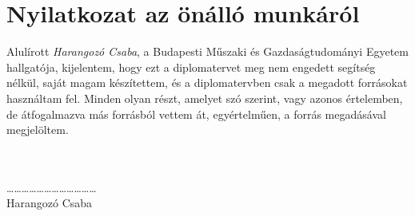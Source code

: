 
\thispagestyle{empty}
\section*{Nyilatkozat az önálló munkáról}

\vfill

\noindent{}Alulírott \emph{Harangozó Csaba}, a Budapesti Műszaki és
Gazdaságtudományi Egyetem hallgatója, kijelentem, hogy ezt a
diplomatervet meg nem engedett segítség nélkül, saját magam
készítettem, és a diplomatervben csak a megadott forrásokat használtam
fel. Minden olyan részt, amelyet szó szerint, vagy azonos értelemben,
de átfogalmazva más forrásból vettem át, egyértelműen, a forrás
megadásával megjelöltem.

\vfill

\begin{multicols}{2}
\begin{center}
  \hspace{1cm}\\
  \hspace{1cm}\\
  \dots\dots\dots\dots\dots\dots\dots\dots\dots\dots\dots\dots\\
  Harangozó Csaba
\end{center}
\end{multicols}